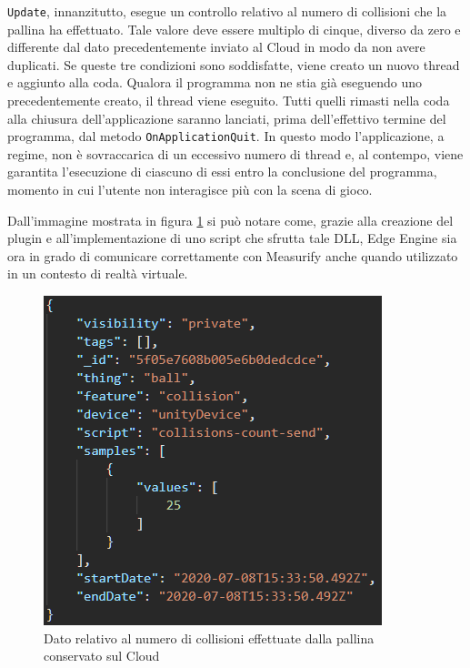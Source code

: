\texttt{Update}, innanzitutto, esegue un controllo relativo al numero di collisioni che la pallina ha effettuato. Tale valore deve essere multiplo di cinque, diverso da zero e differente dal dato precedentemente inviato al Cloud in modo da non avere duplicati. Se queste tre condizioni sono soddisfatte, viene creato un nuovo thread e aggiunto alla coda. Qualora il programma non ne stia già eseguendo uno precedentemente creato, il thread viene eseguito. Tutti quelli rimasti nella coda alla chiusura dell'applicazione saranno lanciati, prima dell'effettivo termine del programma, dal metodo \texttt{OnApplicationQuit}. In questo modo l'applicazione, a regime, non è sovraccarica di un eccessivo numero di thread e, al contempo, viene garantita l'esecuzione di ciascuno di essi entro la conclusione del programma, momento in cui l'utente non interagisce più con la scena di gioco.

Dall'immagine mostrata in figura \ref{risorsaunity} si può notare come, grazie alla creazione del plugin e all'implementazione di uno script che sfrutta tale DLL, Edge Engine sia ora in grado di comunicare correttamente con Measurify anche quando utilizzato in un contesto di realtà virtuale.

\begin{figure}[H]
	\centering
	\includegraphics[scale=0.7]{pics/measunity}
	\caption{Dato relativo al numero di collisioni effettuate dalla pallina conservato sul Cloud}
	\label{risorsaunity}
\end{figure}

